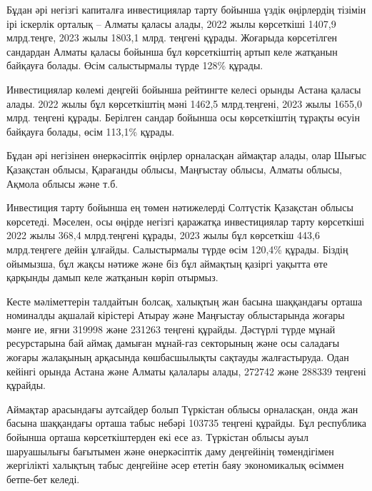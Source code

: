 \begin{multicols}{2}
Бұдан әрі негізгі капиталға инвестициялар тарту бойынша үздік өңірлердің
тізімін ірі іскерлік орталық -- Алматы қаласы алады, 2022 жылы
көрсеткіші 1407,9 млрд.теңге, 2023 жылы 1803,1 млрд. теңгені құрады.
Жоғарыда көрсетілген сандардан Алматы қаласы бойынша бұл көрсеткіштің
артып келе жатқанын байқауға болады. Өсім салыстырмалы түрде 128\%
құрады.

Инвестициялар көлемі деңгейі бойынша рейтингте келесі орынды Астана
қаласы алады. 2022 жылы бұл көрсеткіштің мәні 1462,5 млрд.теңгені, 2023
жылы 1655,0 млрд. теңгені құрады. Берілген сандар бойынша осы
көрсеткіштің тұрақты өсуін байқауға болады, өсім 113,1\% құрады.

Бұдан әрі негізінен өнеркәсіптік өңірлер орналасқан аймақтар алады, олар
Шығыс Қазақстан облысы, Қарағанды облысы, Маңғыстау облысы, Алматы
облысы, Ақмола облысы және т.б.

Инвестиция тарту бойынша ең төмен нәтижелерді Солтүстік Қазақстан облысы
көрсетеді. Мәселен, осы өңірде негізгі қаражатқа инвестициялар тарту
көрсеткіші 2022 жылы 368,4 млрд.теңгені құрады, 2023 жылы бұл көрсеткіш
443,6 млрд.теңгеге дейін ұлғайды. Салыстырмалы түрде өсім 120,4\%
құрады. Біздің ойымызша, бұл жақсы нәтиже және біз бұл аймақтың қазіргі
уақытта өте қарқынды дамып келе жатқанын көріп отырмыз.

Кесте мәліметтерін талдайтын болсақ, халықтың жан басына шаққандағы
орташа номиналды ақшалай кірістері Атырау және Маңғыстау облыстарында
жоғары мәнге ие, яғни 319998 және 231263 теңгені құрайды. Дәстүрлі түрде
мұнай ресурстарына бай аймақ дамыған мұнай-газ секторының және осы
саладағы жоғары жалақының арқасында көшбасшылықты сақтауды жалғастыруда.
Одан кейінгі орында Астана және Алматы қалалары алады, 272742 және
288339 теңгені құрайды.

Аймақтар арасындағы аутсайдер болып Түркістан облысы орналасқан, онда
жан басына шаққандағы орташа табыс небәрі 103735 теңгені құрайды. Бұл
республика бойынша орташа көрсеткіштерден екі есе аз. Түркістан облысы
ауыл шаруашылығы бағытымен және өнеркәсіптік даму деңгейінің
төмендігімен жергілікті халықтың табыс деңгейіне әсер ететін баяу
экономикалық өсіммен бетпе-бет келеді.


\end{multicols}
